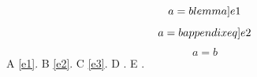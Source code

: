 \documentclass{article}
\begin{document}
\begin{equation}a=b\label[lemma]{e1}\end{equation}
\begin{equation}a=b\label[appendixeq]{e2}\end{equation}
\begin{equation}a=b\label{e3}\end{equation}
A \cref{e1}. B \cref{e2}. C \cref{e3}. D . E .
\end{document}
